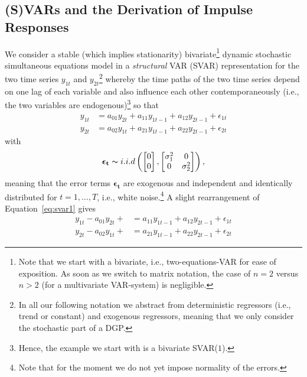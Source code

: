 \documentclass[a4paper,11pt,listof=nochaptergap,oneside,pointednumbers,bibtotoc,bigheadings,liststotoc,hidelinks]{scrbook}
\theoremstyle{mysatz}
\theoremstyle{mydefinition}
\theoremstyle{mytheorem}
\theoremstyle{mybemerkung}
\newcommand{\vect}[1]{\boldsymbol{\mathbf{#1}}}
\begin{document}
\subsection{(S)VARs and the Derivation of Impulse Responses}
\label{sec:SVARsDerviationIRFs}
We consider a stable (which implies stationarity) bivariate\footnote{Note that we start with a bivariate, i.e., two-equations-VAR for ease of exposition. As soon as we switch to matrix notation, the case of $n=2$ versus $n>2$ (for a multivariate VAR-system) is negligible.} dynamic stochastic simultaneous equations model in a \textit{structural} VAR (SVAR) representation for the two time series $y_{1t}$ and $y_{2t}$\footnote{In all our following notation we abstract from deterministic regressors (i.e., trend or constant) and exogenous regressors, meaning that we only consider the stochastic part of a DGP.} whereby the time paths of the two time series depend on one lag of each variable and also influence each other contemporaneously (i.e., the two variables are endogenous)\footnote{Hence, the example we start with is a bivariate SVAR($1$).} so that
\begin{equation} \label{eq:svar1}
\begin{split}
	y_{1t} & = a_{01}y_{2t} + a_{11}y_{1t-1} + a_{12}y_{2t-1} + \epsilon_{1t} \\
	y_{2t} & = a_{02}y_{1t} + a_{21}y_{1t-1} + a_{22}y_{2t-1} + \epsilon_{2t}
\end{split}								
\end{equation}
with 
\begin{equation}
\begin{split}
	\vect{\epsilon_t} \thicksim i.i.d \left (  \begin{bmatrix}
    							0 \\
    							0
 							 \end{bmatrix}, \begin{bmatrix}
    							\sigma_{1}^2 & 0  \\
    							0 & \sigma_{2}^2
 							 \end{bmatrix} \right ),
\end{split}								
\end{equation}
meaning that the error terms $\vect{\epsilon_t}$ are exogenous and independent and identically distributed  for $t = 1, \dots, T$, i.e., white noise.\footnote{Note that for the moment we do not yet impose normality of the errors.} A slight rearrangement of Equation~\ref{eq:svar1} gives 
\begin{equation} \label{eq:svar2}
\begin{split}
	y_{1t} - a_{01}y_{2t} + & = a_{11}y_{1t-1} + a_{12}y_{2t-1} + \epsilon_{1t} \\
	y_{2t} - a_{02}y_{1t} +  & = a_{21}y_{1t-1} + a_{22}y_{2t-1} + \epsilon_{2t}
\end{split}								
\end{equation}
\end{document}
